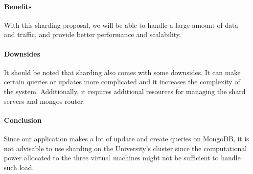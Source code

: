 \paragraph{Benefits}
With this sharding proposal, we will be able to handle a large amount of data and traffic, and provide better performance and scalability.

\paragraph{Downsides}
It should be noted that sharding also comes with some downsides. It can make certain queries or updates more complicated and it increases the complexity of the system. Additionally, it requires additional resources for managing the shard servers and mongos router.

\paragraph{Conclusion}
Since our application makes a lot of update and create queries on MongoDB, it is not advisable to use sharding on the University's cluster since the computational power allocated to the three virtual machines might not be sufficient to handle such load.